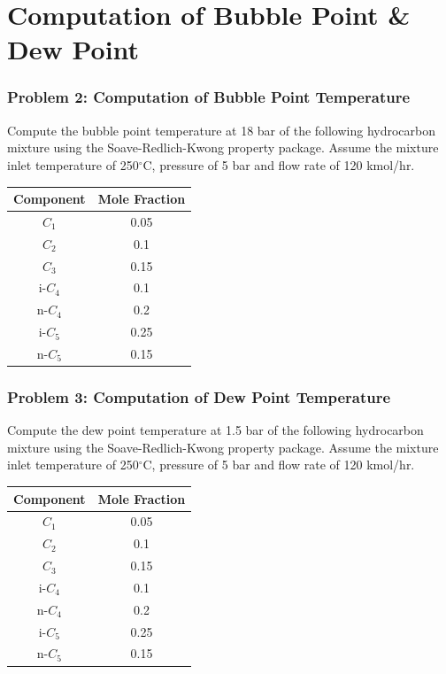 \documentclass[10pt]{beamer}
\begin{document}
\section{Computation of Bubble Point \& Dew Point}
\begin{frame}
\frametitle{Problem 2: Computation of Bubble Point Temperature}
Compute the bubble point temperature at 18 bar of the following
hydrocarbon mixture using the Soave-Redlich-Kwong property
package. Assume the mixture inlet temperature of 250$^\circ$C, pressure of 5
bar and flow rate of 120 kmol/hr.

\begin{center}
\begin{tabular}{|c|c|}
\hline
Component & Mole Fraction \\ \hline
$C_1$ & 0.05 \\ \hline
$C_2$ & 0.1 \\ \hline
$C_3$ & 0.15 \\ \hline
i-$C_4$ & 0.1 \\ \hline
n-$C_4$ & 0.2 \\ \hline
i-$C_5$ & 0.25 \\ \hline
n-$C_5$ & 0.15 \\ \hline
\end{tabular}
\end{center}

\end{frame}

\begin{frame}
\frametitle{Problem 3: Computation of Dew Point Temperature}
Compute the dew point temperature at 1.5 bar of the following
hydrocarbon mixture using the Soave-Redlich-Kwong property
package. Assume the mixture inlet temperature of 250$^\circ$C, pressure of 5
bar and flow rate of 120 kmol/hr.

\begin{center}
\begin{tabular}{|c|c|}
\hline
Component & Mole Fraction \\ \hline
$C_1$ & 0.05 \\ \hline
$C_2$ & 0.1 \\ \hline
$C_3$ & 0.15 \\ \hline
i-$C_4$ & 0.1 \\ \hline
n-$C_4$ & 0.2 \\ \hline
i-$C_5$ & 0.25 \\ \hline
n-$C_5$ & 0.15 \\ \hline
\end{tabular}
\end{center}

\end{frame}
\end{document}

